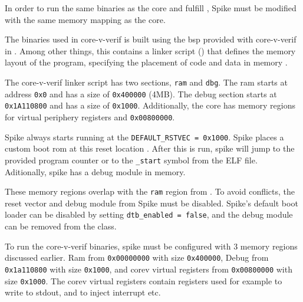 In order to run the same binaries as the core and fulfill , Spike must be modified with the same memory mapping as the core.


The binaries used in core-v-verif is built using the \acrfull{bsp} provided with core-v-verif in . Among other things, this contains a linker script () that defines the memory layout of the program, specifying the placement of code and data in memory \cite{openhwgroupCorevverifCv32e40sBsp}. 

The core-v-verif linker script has two sections, \lstinline{ram} and \lstinline{dbg}. The ram starts at address \lstinline{0x0} and has a size of \lstinline{0x400000} (4MB). The debug section starts at \lstinline{0x1A110800} and has a size of \lstinline{0x1000}. Additionally, the core has memory regions for virtual periphery registers and \lstinline{0x00800000}.

%


Spike always starts running at the \lstinline{DEFAULT_RSTVEC = 0x1000}. Spike places a custom boot rom at this reset location \cite{evancoxAddDocumentationLowlevel2017}.
After this is run, spike will jump to the provided program counter or to the \lstinline{_start} symbol from the ELF file. Aditionally, spike has a debug module in memory.

These memory regions overlap with the \lstinline{ram} region from .
To avoid conflicts, the reset vector and debug module from Spike must be disabled. Spike's default boot loader can be disabled by setting \lstinline{dtb_enabled = false}, and the debug module can be removed from the  class.


To run the core-v-verif binaries, spike must be configured with 3 memory regions discussed earlier. Ram from \lstinline{0x00000000} with size \lstinline{0x400000}, Debug from \lstinline{0x1a110800} with size \lstinline{0x1000}, and corev virtual registers from \lstinline{0x00800000} with size \lstinline{0x1000}. The corev virtual registers contain registers used for example to write to stdout, and to inject interrupt etc.

